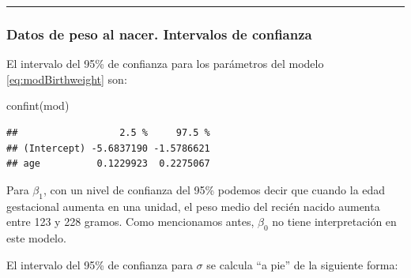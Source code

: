 \documentclass[
]{article}
\newenvironment{Shaded}{\begin{snugshade}}{\end{snugshade}}
\newcommand{\AttributeTok}[1]{\textcolor[rgb]{0.77,0.63,0.00}{#1}}
\newcommand{\DecValTok}[1]{\textcolor[rgb]{0.00,0.00,0.81}{#1}}
\newcommand{\FloatTok}[1]{\textcolor[rgb]{0.00,0.00,0.81}{#1}}
\newcommand{\FunctionTok}[1]{\textcolor[rgb]{0.00,0.00,0.00}{#1}}
\newcommand{\NormalTok}[1]{#1}
\newcommand{\OtherTok}[1]{\textcolor[rgb]{0.56,0.35,0.01}{#1}}
\newcommand{\SpecialCharTok}[1]{\textcolor[rgb]{0.00,0.00,0.00}{#1}}
\begin{document}
\rule{\textwidth}{0.4pt}

\hypertarget{datos-de-peso-al-nacer.-intervalos-de-confianza}{%
\subsubsection*{Datos de peso al nacer. Intervalos de confianza}\label{datos-de-peso-al-nacer.-intervalos-de-confianza}}

El intervalo del 95\% de confianza para los parámetros del modelo \eqref{eq:modBirthweight} son:

\begin{Shaded}
\begin{Highlighting}[]
\FunctionTok{confint}\NormalTok{(mod)}
\end{Highlighting}
\end{Shaded}

\begin{verbatim}
##                  2.5 %     97.5 %
## (Intercept) -5.6837190 -1.5786621
## age          0.1229923  0.2275067
\end{verbatim}

Para \(\beta_{1}\), con un nivel de confianza del 95\% podemos decir que cuando la edad gestacional aumenta en una unidad, el peso medio del recién nacido aumenta entre 123 y 228 gramos. Como mencionamos antes, \(\beta_{0}\) no tiene interpretación en este modelo.

El intervalo del 95\% de confianza para \(\sigma\) se calcula ``a pie'' de la siguiente forma:

\begin{Shaded}
\end{Shaded}
\end{document}
